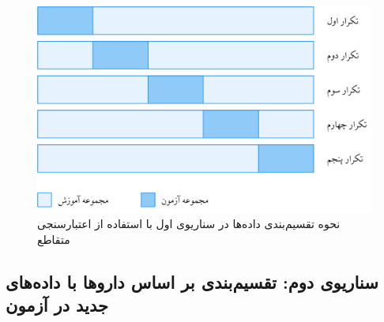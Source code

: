 \begin{figure}[t]
	\centering
	\includegraphics[width=\textwidth]{images/senario-1.png}
	\caption{نحوه تقسیم‌بندی داده‌ها در سناریوی اول با استفاده از اعتبارسنجی متقاطع }
	\label{fig:senario-1}
\end{figure}

\subsection{سناریوی دوم: تقسیم‌بندی بر اساس داروها با داده‌های جدید در آزمون}

